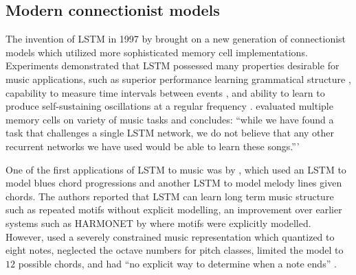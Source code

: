 \subsection{Modern connectionist models}

The invention of LSTM in 1997 by \citet{hochreiter1997long} brought on a new
generation of connectionist models which utilized more sophisticated memory
cell implementations. Experiments demonstrated that LSTM possessed many
properties desirable for music applications, such as superior performance
learning grammatical structure \citep{gers2001lstm}, capability to measure time
intervals between events \citep{gers2000recurrent}, and ability to learn to
produce self-sustaining oscillations at a regular frequency
\citet{gers2002learning}. \citet{franklin2006recurrent} evaluated multiple
memory cells on variety of music tasks and concludes: ``while we have found a
task that challenges a single LSTM network, we do not believe that any other
recurrent networks we have used would be able to learn these songs.'''

One of the first applications of LSTM to music was by
\citet{Eck2002,Eck2002-blues}, which used an LSTM to model blues chord
progressions and another LSTM to model melody lines given chords. The authors
reported that LSTM can learn long term music structure such as repeated motifs
without explicit modelling, an improvement over earlier systems such as
HARMONET by \citet{feulner1994melonet} where motifs were explicitly modelled. However,
\citet{Eck2002} used a severely constrained music representation which quantized
to eight notes, neglected the octave numbers for pitch classes, limited the
model to $12$ possible chords, and had ``no explicit way to determine when a
note ends'' \citet{Eck2002}.



